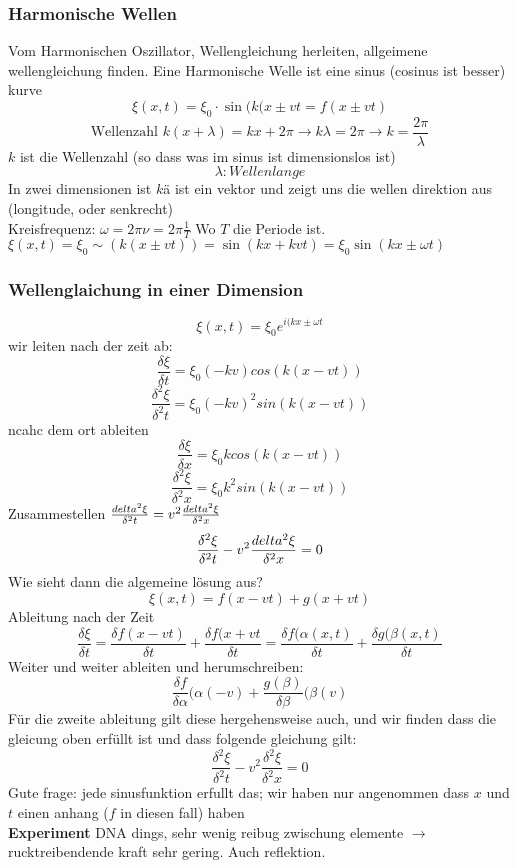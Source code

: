 \documentclass{article}
\newcommand{\experiment}{\\[2ex]\textbf{Experiment }}
\begin{document}
\subsubsection{Harmonische Wellen} Vom Harmonischen Oszillator, Wellengleichung herleiten, allgeimene wellengleichung finden. Eine Harmonische Welle ist eine sinus (cosinus ist besser) kurve
\[\xi(x,t)=\xi_0\cdot\sin(k(x\pm vt=f(x\pm vt)\]
\[\text{Wellenzahl }k(x+\lambda)=kx+2\pi \rightarrow k\lambda = 2\pi \rightarrow k=\frac{2\pi}{\lambda}\]
$k$ ist die Wellenzahl (so dass was im sinus ist dimensionslos ist)  \[\lambda:{Wellenlange}\]
In zwei dimensionen ist $k$ä ist ein vektor und zeigt uns die wellen direktion aus (longitude, oder senkrecht)
\\Kreisfrequenz: $\omega=2\pi\nu=2\pi\frac{1}{T}$ Wo $T$ die Periode ist.\\$\xi(x,t)=\xi_0\sim(k(x\pm vt))=\sin(kx+kvt)=\xi_0\sin(kx\pm\omega t)$
\subsubsection{Wellenglaichung in einer Dimension}
\[\xi(x,t)=\xi_0e^{i(kx\pm \omega t}\]
wir leiten nach der zeit ab:
\[\frac{\delta\xi}{\delta t}=\xi_0(-kv)cos(k(x-vt))\]
\[\frac{\delta^2\xi}{\delta^2t}=\xi_0(-kv)^2sin(k(x-vt))\]
ncahc dem ort ableiten
\[\frac{\delta\xi}{\delta x}=\xi_0kcos(k(x-vt))\]
\[\frac{\delta^2\xi}{\delta^2x}=\xi_0k^2sin(k(x-vt))\]
Zusammestellen $\frac{\\delta^2\xi}{\delta^2t}=v^2\frac{\\delta^2\xi}{\delta^2x}$
\[\frac{\delta^2\xi}{\delta^2t}-v^2\frac{\\delta^2\xi}{\delta^2x}=0\]
Wie sieht dann die algemeine lösung aus?
\[\xi(x,t)=f(x-vt)+g(x+vt)\]
Ableitung nach der Zeit
\[\frac{\delta\xi}{\delta t}=\frac{\delta f(x-vt)}{\delta t}+\frac{\delta f(x+vt}{\delta t}=\frac{\delta f(\alpha(x,t)}{\delta t}+\frac{\delta g(\beta(x,t)}{\delta t}\]
Weiter und weiter ableiten und herumschreiben:
\[\frac{\delta f}{\delta \alpha}(\alpha(-v)+\frac{g(\beta)}{\delta \beta}(\beta(v)\]
Für die zweite ableitung gilt diese hergehensweise auch, und wir finden dass die gleicung oben erfüllt ist und dass folgende gleichung gilt:
\[\frac{\delta^2\xi}{\delta^2t}-v^2\frac{\delta^2\xi}{\delta^2x}=0\]
Gute frage: jede sinusfunktion erfullt das; wir haben nur angenommen dass $x$ und $t$ einen anhang ($f$ in diesen fall) haben
\experiment DNA dings, sehr wenig reibug zwischung elemente $\rightarrow$ rucktreibendende kraft sehr gering. Auch reflektion. 
\end{document}
